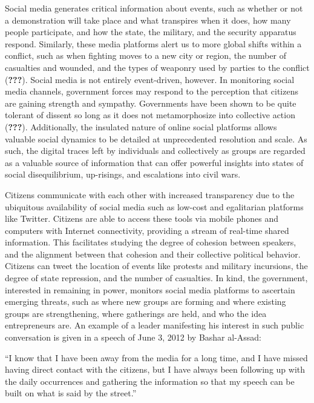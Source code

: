 \documentclass[english,man]{apa6}
\begin{document}
Social media generates critical information about events, such as whether or not a demonstration will take place and what transpires when it does, how many people participate, and how the state, the military, and the security apparatus respond. Similarly, these media platforms alert us to more global shifts within a conflict, such as when fighting moves to a new city or region, the number of casualties and wounded, and the types of weaponry used by parties to the conflict ({\textbf{???}}). Social media is not entirely event-driven, however. In monitoring social media channels, government forces may respond to the perception that citizens are gaining strength and sympathy. Governments have been shown to be quite tolerant of dissent so long as it does not metamorphosize into collective action ({\textbf{???}}). Additionally, the insulated nature of online social platforms allows valuable social dynamics to be detailed at unprecedented resolution and scale. As such, the digital traces left by individuals and collectively as groups are regarded as a valuable source of information that can offer powerful insights into states of social disequilibrium, up-risings, and escalations into civil wars.

Citizens communicate with each other with increased transparency due to the ubiquitous availability of social media such as low-cost and egalitarian platforms like Twitter. Citizens are able to access these tools via mobile phones and computers with Internet connectivity, providing a stream of real-time shared information. This facilitates studying the degree of cohesion between speakers, and the alignment between that cohesion and their collective political behavior. Citizens can tweet the location of events like protests and military incursions, the degree of state repression, and the number of casualties. In kind, the government, interested in remaining in power, monitors social media platforms to ascertain emerging threats, such as where new groups are forming and where existing groups are strengthening, where gatherings are held, and who the idea entrepreneurs are. An example of a leader manifesting his interest in such public conversation is given in a speech of June 3, 2012 by Bashar al-Assad:

\enquote{I know that I have been away from the media for a long time, and I have missed having direct contact with the citizens, but I have always been following up with the daily occurrences and gathering the information so that my speech can be built on what is said by the street.}
\end{document}
